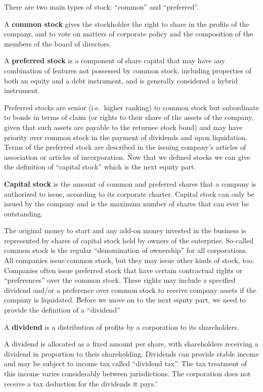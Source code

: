 There are two main types of stock: ``common'' and ``preferred''.

A \textbf{common stock} gives the stockholder the right to share in the profits of the company, and to vote on matters
of corporate policy and the composition of the members of the board of directors.
\ed

A \textbf{preferred stock} is a component of share capital that may have any combination of features not possessed by
common stock, including properties of both an equity and a debt instrument, and is generally considered a hybrid
instrument.
\ed

Preferred stocks are senior (i.e.\ higher ranking) to common stock but subordinate to bonds in terms of claim (or
rights to their share of the assets of the company, given that such assets are payable to the returnee stock bond)
and may have priority over common stock in the payment of dividends and upon liquidation. Terms of the preferred
stock are described in the issuing company's articles of association or articles of incorporation. \v

Now that we defined stocks we can give the definition of ``capital stock'' which is the next equity part.

\textbf{Capital stock} is the amount of common and preferred shares that a company is authorized to issue, according
to its corporate charter. Capital stock can only be issued by the company and is the maximum number of shares that
can ever be outstanding.
\ed

The original money to start and any add-on money invested in the business is represented by shares of capital stock
held by owners of the enterprise. So-called common stock is the regular ``denomination of ownership'' for all
corporations. All companies issue common stock, but they may issue other kinds of stock, too. Companies often issue
preferred stock that have certain contractual rights or ``preferences'' over the common stock. These rights may include
a specified dividend and/or a preference over common stock to receive company assets if the company is liquidated. \v

Before we move on to the next equity part, we need to provide the definition of a ``dividend''

\bd[Dividend]
A \textbf{dividend} is a distribution of profits by a corporation to its shareholders.
\ed

A dividend is allocated as a fixed amount per share, with shareholders receiving a dividend in proportion to their
shareholding. Dividends can provide stable income and may be subject to income tax called ``dividend
tax''. The tax treatment of this income varies considerably between jurisdictions. The corporation does not receive a
tax deduction for the dividends it pays. \v

